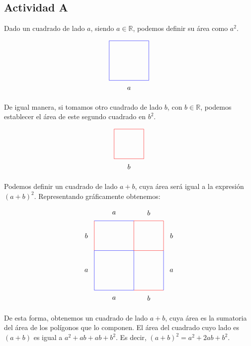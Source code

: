 \subsection{Actividad A}

Dado un cuadrado de lado $a$, siendo $a \in \mathbb{R}$, podemos definir su área como $a^2$.

\begin{align*}
\begin{tikzpicture}
\draw[blue] (0,0) rectangle (2,2);
\draw (1, -0.4) node{$a$};
\end{tikzpicture}
\end{align*}

De igual manera, si tomamos otro cuadrado de lado $b$, con $b \in \mathbb{R}$, podemos establecer el área de este segundo cuadrado en $b^2$. 

\begin{align*}
\begin{tikzpicture}
\draw[red] (0,0) rectangle (1.5,1.5);
\draw (.75, -0.4) node{$b$};
\end{tikzpicture}
\end{align*}

Podemos definir un cuadrado de lado $a+b$, cuya área será igual a la expresión $(a+b)^2$. Representando gráficamente obtenemos:

\begin{align*}
\begin{tikzpicture}
\draw[blue] (0,0) rectangle (2,2);
\draw (1, -0.4) node{$a$};
\draw[red] (2,2) rectangle (3.5,3.5);
\draw (3.9, 2.75) node{$b$};
\draw[red] (2,0) -- (3.5,0);
\draw (2.75, -0.4) node{$b$};
\draw[blue] (3.5, 0) -- (3.5, 2);
\draw (3.9, 1) node{$a$};
\draw[blue] (0, 3.5) -- (2, 3.5);
\draw (1, 3.9) node{$a$};
\draw[red] (0, 2) -- (0, 3.5);
\draw (-0.4, 2.75) node{$b$};
\draw (2.75, 3.9) node{$b$};
\draw (-0.4, 1) node{$a$};
\end{tikzpicture}
\end{align*}

De esta forma, obtenemos un cuadrado de lado $a+b$, cuya área es la sumatoria del área de los polígonos que lo componen. El área del cuadrado cuyo lado es $(a+b)$ es igual a $a^2 + ab + ab + b^2$. Es decir, $(a + b)^2 = a^2 + 2ab + b^2$.
